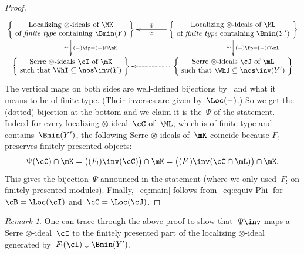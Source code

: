 \documentclass[11pt]{amsart}
\numberwithin{equation}{section} %
\theoremstyle{plain}
\theoremstyle{definition}
\theoremstyle{remark}
\newtheorem{rem}[equation]{Remark}
\begin{document}
\begin{proof}
\begin{equation*}
\label{eq:fin-loc-rectangle}%
\vcenter{
\xymatrix@C=4em@R=2em{
\left\{\ 
\substack{\displaystyle\textrm{Localizing $\otimes$-ideals of~$\MK$}
\\[.1em]
\displaystyle\textrm{of \emph{finite type} containing~$\Bmin(Y)$}}
\ \right\}
\ar[d]^-{(-)\fp=(-)\cap\mK}_-{\simeq}
& \left\{\ 
\substack{\displaystyle\textrm{Localizing $\otimes$-ideals of~$\ML$}
\\[.1em]
\displaystyle\textrm{of \emph{finite type} containing $\Bmin(Y')$}}
\ \right\}
\ar[l]_-{\Psi}^-{\simeq}
\ar[d]^-{(-)\fp=(-)\cap\mL}_-{\simeq}
\\
\left\{\ 
\substack{\displaystyle\textrm{Serre $\otimes$-ideals $\cI$ of~$\mK$}
\\[.2em]
\displaystyle\textrm{such that $\WhI\subseteq\nos\inv(Y)$}}
\ \right\}
& \left\{\ 
\substack{\displaystyle\textrm{Serre $\otimes$-ideals $\cJ$ of~$\mL$}
\\[.2em]
\displaystyle\textrm{such that $\WhJ\subseteq\nos\inv(Y')$}}
\ \right\}
\ar@{..>}[l]_-{}
}}
\end{equation*}
%
The vertical maps on both sides are well-defined bijections by~ and what it means to be of finite type. (Their inverses are given by~$\Loc(-)$.)
So we get the (dotted) bijection at the bottom and we claim it is the~$\Psi$ of the statement.
Indeed for every localizing $\otimes$-ideal~$\cC$ of~$\ML$, which is of finite type and contains~$\Bmin(Y')$, the following Serre $\otimes$-ideals of~$\mK$ coincide because $F_!$ preserves finitely presented objects:
%
\[
\Psi(\cC)\cap\mK=\big((F_!)\inv(\cC)\big)\cap\mK=\big((F_!)\inv(\cC\cap \mL)\big)\cap \mK.
\]
%
This gives the bijection~$\Psi$ announced in the statement (where we only used~$F_!$ on finitely presented modules).
Finally,~\eqref{eq:main} follows from~\eqref{eq:equiv-Phi} for~$\cB=\Loc(\cI)$ and~$\cC=\Loc(\cJ)$.
\end{proof}
%
\begin{rem}
One can trace through the above proof to show that~$\Psi\inv$ maps a Serre $\otimes$-ideal~$\cI$ to the finitely presented part of the localizing $\otimes$-ideal generated by~$F_!(\cI)\cup\Bmin(Y')$.
\end{rem}
\end{document}
